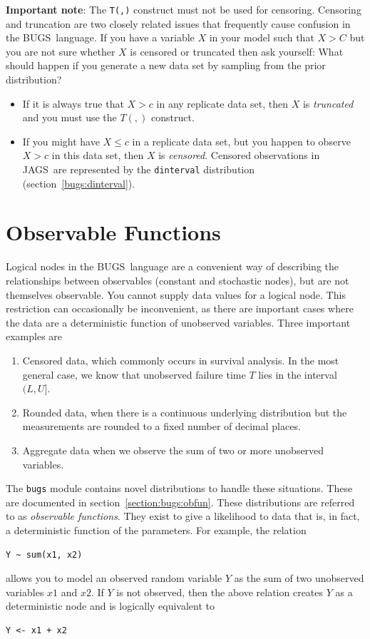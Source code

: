 \documentclass[11pt, a4paper, titlepage]{report}
\newcommand{\JAGS}{\textsf{JAGS}}
\newcommand{\BUGS}{\textsf{BUGS}}
\begin{document}
{\bf Important note}: The \texttt{T(,)} construct must not be used for
censoring. Censoring and truncation are two closely related issues
that frequently cause confusion in the \BUGS\ language. If you have a
variable $X$ in your model such that $X > C$ but you are not sure
whether $X$ is censored or truncated then ask yourself: What should
happen if you generate a new data set by sampling from the prior
distribution? 
\begin{itemize}
\item If it is always true that $X > c$ in any replicate data set,
  then $X$ is {\em truncated} and you must use the $T(,)$ construct.
\item If you might have $X \leq c$ in a replicate data set, but you
  happen to observe $X > c$ in this data set, then $X$ is {\em
    censored}. Censored observations in \JAGS\ are represented by the
  \texttt{dinterval} distribution (section~\ref{bugs:dinterval}).
\end{itemize}

\section{Observable Functions}
\label{section:obfun}

Logical nodes in the \BUGS\ language are a convenient way of
describing the relationships between observables (constant and
stochastic nodes), but are not themselves observable. You cannot
supply data values for a logical node.  This restriction can
occasionally be inconvenient, as there are important cases where the
data are a deterministic function of unobserved variables.  Three
important examples are
\begin{enumerate}
\item Censored data, which commonly occurs in survival analysis. In
the most general case, we know that unobserved failure time $T$
lies in the interval $(L,U]$.
\item Rounded data, when there is a continuous underlying distribution
but the measurements are rounded to a fixed number of decimal places.
\item Aggregate data when we observe the sum of two or more
unobserved variables.
\end{enumerate}
The \texttt{bugs} module contains novel distributions to handle these
situations. These are documented in section~\ref{section:bugs:obfun}.
These distributions are referred to as {\em observable
  functions}. They exist to give a likelihood to data that is, in
fact, a deterministic function of the parameters.  For example, the
relation
\begin{verbatim}
Y ~ sum(x1, x2)
\end{verbatim}
allows you to model an observed random variable $Y$ as the sum of two
unobserved variables $x1$ and $x2$. If $Y$ is not observed, then the
above relation creates $Y$ as a deterministic node and is logically
equivalent to
\begin{verbatim}
Y <- x1 + x2
\end{verbatim}
\end{document}
